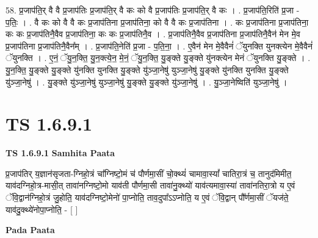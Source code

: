 \documentclass[17pt]{extarticle}
\begin{document}
58. प्र॒जाप॑ति॒र् वै वै प्र॒जाप॑तिः प्र॒जाप॑ति॒र् वै कः को वै प्र॒जाप॑तिः प्र॒जाप॑ति॒र् वै कः । . प्र॒जाप॑ति॒रिति॑ प्र॒जा - प॒तिः॒ । . वै कः को वै वै कः प्र॒जाप॑तिना प्र॒जाप॑तिना॒ को वै वै कः प्र॒जाप॑तिना । . कः प्र॒जाप॑तिना प्र॒जाप॑तिना॒ कः कः प्र॒जाप॑तिनै॒वैव प्र॒जाप॑तिना॒ कः कः प्र॒जाप॑तिनै॒व । . प्र॒जाप॑तिनै॒वैव प्र॒जाप॑तिना प्र॒जाप॑तिनै॒वैन॑ मेन मे॒व प्र॒जाप॑तिना प्र॒जाप॑तिनै॒वैन᳚म् । . प्र॒जाप॑ति॒नेति॑ प्र॒जा - प॒ति॒ना॒ । . ए॒वैन॑ मेन मे॒वैवैनं॑ ॅयुनक्ति युनक्त्येन मे॒वैवैनं॑ ॅयुनक्ति । . ए॒नं॒ ॅयु॒न॒क्ति॒ यु॒न॒क्त्ये॒न॒ मे॒नं॒ ॅयु॒न॒क्ति॒ यु॒ङ्क्ते यु॒ङ्क्ते यु॑नक्त्येन मेनं ॅयुनक्ति यु॒ङ्क्ते । . यु॒न॒क्ति॒ यु॒ङ्क्ते यु॒ङ्क्ते यु॑नक्ति युनक्ति यु॒ङ्क्ते यु॑ञ्जा॒नेषु॑ युञ्जा॒नेषु॑ यु॒ङ्क्ते यु॑नक्ति युनक्ति यु॒ङ्क्ते यु॑ञ्जा॒नेषु॑ । . यु॒ङ्क्ते यु॑ञ्जा॒नेषु॑ युञ्जा॒नेषु॑ यु॒ङ्क्ते यु॒ङ्क्ते यु॑ञ्जा॒नेषु॑ । . यु॒ञ्जा॒नेष्विति॑ युञ्जा॒नेषु॑ । \newline
\pagebreak
{}
\section*{ TS 1.6.9.1 }

\textbf{TS 1.6.9.1 } \newline
\textbf{Samhita Paata} \newline

प्र॒जाप॑तिर् य॒ज्ञान॑सृजता-ग्निहो॒त्रं चा᳚ग्निष्टो॒मं च॑ पौर्णमा॒सीं चो॒क्थ्यं॑ चामावा॒स्यां᳚ चातिरा॒त्रं च॒ तानुद॑मिमीत॒ याव॑दग्निहो॒त्र-मासी॒त् तावा॑नग्निष्टो॒मो याव॑ती पौर्णमा॒सी तावा॑नु॒क्थ्यो॑ याव॑त्यमावा॒स्या॑ तावा॑नतिरा॒त्रो य ए॒वं ॅवि॒द्वान॑ग्निहो॒त्रं जु॒होति॒ याव॑दग्निष्टो॒मेनो॑ पा॒प्नोति॒ ताव॒दुपा᳚ऽऽप्नोति॒ य ए॒वं ॅवि॒द्वान् पौ᳚र्णमा॒सीं ॅयज॑ते॒ याव॑दु॒क्थ्ये॑नोपा॒प्नोति॒ - [ ] \newline

\textbf{Pada Paata} \newline
\end{document}
